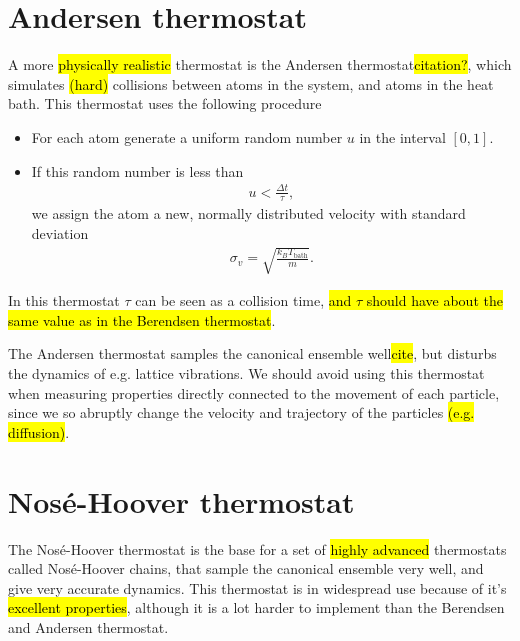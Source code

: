 \section{Andersen thermostat}
A more \hl{physically realistic} thermostat is the Andersen thermostat\hl{citation?}, which simulates \hl{(hard)} collisions between atoms in the system, and atoms in the heat bath. This thermostat uses the following procedure
%
\begin{itemize}
    \item For each atom generate a uniform random number $u$ in the interval $[0,1]$.
    \item If this random number is less than
        \begin{align*}
            u < \frac{\Delta t}{\tau},
        \end{align*}
        we assign the atom a new, normally distributed velocity with standard deviation
        \begin{align*}
            \sigma_v = \sqrt{\frac{k_B T_\text{bath}}{m}}.
        \end{align*}
\end{itemize}
%
In this thermostat $\tau$ can be seen as a collision time, \hl{and $\tau$ should have about the same value as in the Berendsen thermostat}.

The Andersen thermostat samples the canonical ensemble well\hl{cite}, but disturbs the dynamics of e.g. lattice vibrations. We should avoid using this thermostat when measuring properties directly connected to the movement of each particle, since we so abruptly change the velocity and trajectory of the particles \hl{(e.g. diffusion)}.

\section{Nos\'e-Hoover thermostat}
The Nos\'e-Hoover thermostat is the base for a set of \hl{highly advanced} thermostats called Nos\'e-Hoover chains, that sample the canonical ensemble very well, and give very accurate dynamics.  This thermostat is in widespread use because of it's \hl{excellent properties}, although it is a lot harder to implement than the Berendsen and Andersen thermostat.

